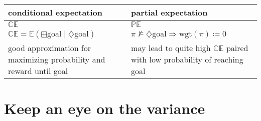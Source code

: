 \documentclass[onlymath]{beamer}
\begin{document}
\begin{frame}
\begin{tabular}{|p{5cm}|p{5cm}|}
\hline
conditional expectation & partial expectation \\ \hline
$\mathbb{CE}$ & $\mathbb{PE}$ \\ \hline
$\mathbb{CE} = \mathbb{E}(\boxplus \mathrm{goal}\mid \diamondsuit \mathrm{goal})$ & $\pi \nvDash \diamondsuit\mathrm{goal} \Rightarrow \mathrm{wgt}(\pi)\coloneqq0$ \\ \hline
good approximation for \newline maximizing probability and reward until goal & may lead to quite high $\mathbb{CE}$ paired with \newline low probability of reaching goal \\ \hline

\end{tabular}
\end{frame}

\section{Keep an eye on the variance}
\end{document}
